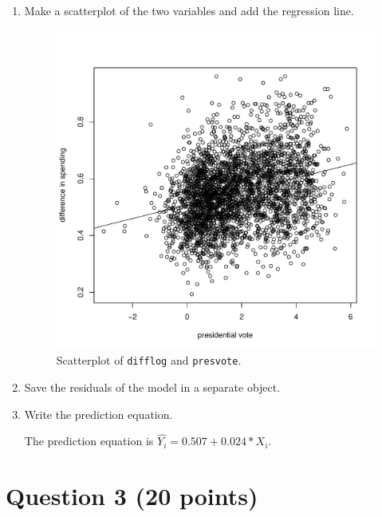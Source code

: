 \documentclass[12pt,letterpaper]{article}
\begin{document}
\begin{enumerate}
		\item Make a scatterplot of the two variables and add the regression line. 	
		\begin{figure}[h!]\centering
			\caption{\footnotesize Scatterplot of \texttt{difflog} and \texttt{presvote}.
			}\vspace{-1cm}
			\label{fig:plot2}
			\includegraphics[width=.75\textwidth]{plot2.pdf}
		\end{figure}
		\vspace{.25cm}
		\item Save the residuals of the model in a separate object.	
		\item Write the prediction equation.
		
		The prediction equation is $\hat{Y_{i}}=0.507+0.024*X_i$.\\
	\end{enumerate}
	
	\newpage	
\section*{Question 3 (20 points)}
\end{document}

